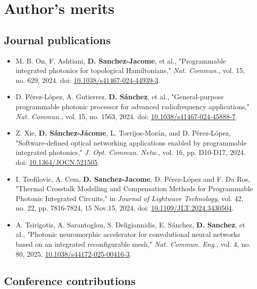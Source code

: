 
\chapter*{Author's merits} \label{sec:merits}

\section*{Journal publications}

\begin{itemize}
  \item M. B. On, F. Ashtiani, \textbf{D. Sanchez-Jacome}, et al., "Programmable integrated photonics for topological Hamiltonians," \textit{Nat. Commun.}, vol. 15, no. 629, 2024. doi: \href{https://doi.org/10.1038/s41467-024-44939-3}{10.1038/s41467-024-44939-3}.
  \item D. Pérez-López, A. Gutierrez, \textbf{D. Sánchez}, et al., "General-purpose programmable photonic processor for advanced radiofrequency applications," \textit{Nat. Commun.}, vol. 15, no. 1563, 2024. doi: \href{https://doi.org/10.1038/s41467-024-45888-7}{10.1038/s41467-024-45888-7}.
  \item Z. Xie, \textbf{D. Sánchez-Jácome}, L. Torrijos-Morán, and D. Pérez-López, "Software-defined optical networking applications enabled by programmable integrated photonics," \textit{J. Opt. Commun. Netw.}, vol. 16, pp. D10-D17, 2024. doi: \href{https://doi.org/10.1364/JOCN.521505}{10.1364/JOCN.521505}.
  \item I. Teofilovic, A. Cem, \textbf{D. Sanchez-Jacome}, D. Pérez-López and F. Da Ros, "Thermal Crosstalk Modelling and Compensation Methods for Programmable Photonic Integrated Circuits," in
    \textit{Journal of Lightwave Technology}, vol. 42, no. 22, pp. 7816-7824, 15 Nov.15, 2024, doi: \href{https://doi.org/10.1109/JLT.2024.3430504}{10.1109/JLT.2024.3430504}.
  \item A. Tsirigotis, A. Sarantoglou, S. Deligiannidis, E. Sánchez, \textbf{D. Sanchez}, et al., "Photonic neuromorphic accelerator for convolutional neural networks based on an integrated
    reconfigurable mesh," \textit{Nat. Commun. Eng.}, vol. 4, no. 80, 2025. \href{https://doi.org/10.1038/s44172-025-00416-3}{10.1038/s44172-025-00416-3}.
\end{itemize}

\section*{Conference contributions}

